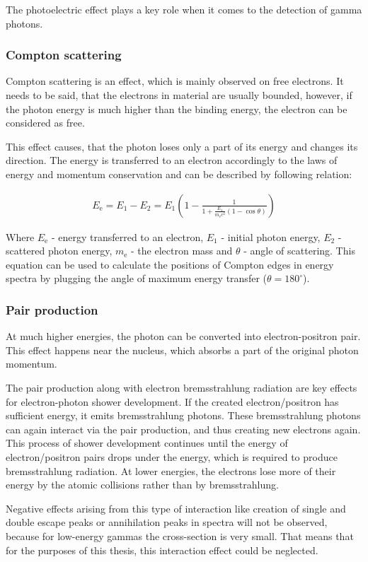 \par

The photoelectric effect plays a key role when it comes to the detection of gamma photons.

\subsubsection{Compton scattering}
Compton scattering is an effect, which is mainly observed on free electrons. It needs to be said, that the electrons in material are usually bounded, however, if the photon energy is much higher than the binding energy, the electron can be considered as free.
\par
This effect causes, that the photon loses only a part of its energy and changes its direction. The energy is transferred to an electron accordingly to the laws of energy and momentum conservation and can be described by following relation:

\begin{equation}
\begin{aligned}
E_{\textrm{e}} = E_1 - E_2 = E_1 (1- \frac{1}{1+\frac{E_1}{m_{\textrm{e}}c^2}(1 - \cos{\theta})})
\end{aligned}
\label{compton}
\end{equation}


\par
Where $E_{\textrm{e}}$ - energy transferred to an electron, $E_1$ - initial photon energy, $E_2$ - scattered photon energy, $m_{\textrm{e}}$ - the electron mass and $\theta$ - angle of scattering. This equation can be used to calculate the positions of Compton edges in energy spectra by plugging the angle of maximum energy transfer ($\theta = 180^\circ$).


\subsubsection{Pair production}
At much higher energies, the photon can be converted into electron-positron pair. This effect happens near the nucleus, which absorbs a part of the original photon momentum.
\par
The pair production along with electron bremsstrahlung radiation  are key effects for electron-photon shower development. If the created electron/positron has sufficient energy, it emits bremsstrahlung photons. These bremsstrahlung photons can again interact via the pair production, and thus creating new electrons again. This process of shower development continues until the energy of electron/positron pairs drops under the energy, which is required to produce bremsstrahlung radiation. At lower energies, the electrons lose more of their energy by the atomic collisions rather than by bremsstrahlung.
\par
Negative effects arising from this type of interaction like creation of single and double escape peaks or annihilation peaks in spectra will not be observed, because for low-energy gammas the cross-section is very small. That means that for the purposes of this thesis, this interaction effect could be neglected.   


